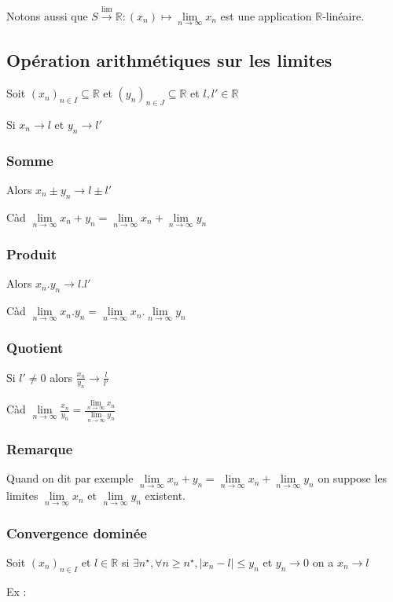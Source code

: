 \documentclass[a4paper,10pt]{article}
\newcommand{\ap}{\rightarrow}
\newcommand{\apw}[1]{\stackrel{#1}{\rightarrow}}
\newcommand{\R}{\mathbb{R}}
\newcommand{\abs}[1]{\left\vert #1 \right\vert}
\begin{document}
Notons aussi que $S \apw{\lim} \R : (x_n) \mapsto \lim\limits_{n\ap\infty} x_n$ est une application $\R$-linéaire.

\subsection{Opération arithmétiques sur les limites}
Soit $(x_n)_{n\in I} \subseteq \R$ et $(y_n)_{n \in J} \subseteq \R$ et $l,l' \in \R$

Si $x_n \ap l$ et $y_n \ap l'$ 
\subsubsection{Somme}
Alors $x_n \pm y_n \ap l \pm l'$

Càd $\lim\limits_{n\ap\infty} x_n + y_n = \lim\limits_{n\ap\infty} x_n + \lim\limits_{n\ap\infty} y_n$
\subsubsection{Produit}
Alors $x_n . y_n \ap l . l'$

Càd $\lim\limits_{n\ap\infty} x_n . y_n = \lim\limits_{n\ap\infty} x_n . \lim\limits_{n\ap\infty} y_n$
\subsubsection{Quotient}
Si $l' \neq 0$ alors $\frac{x_n}{y_n} \ap \frac{l}{l'}$

Càd $\lim\limits_{n\ap\infty} \frac{x_n}{y_n} = \frac{\lim\limits_{n\ap\infty} x_n}{\lim\limits_{n\ap\infty} y_n}$

\subsubsection{Remarque}

Quand on dit par exemple $\lim\limits_{n\ap\infty} x_n + y_n = \lim\limits_{n\ap\infty} x_n + \lim\limits_{n\ap\infty} y_n$ on suppose les limites $\lim\limits_{n\ap\infty} x_n$ et $\lim\limits_{n\ap\infty} y_n$ existent.

\subsubsection{Convergence dominée}

Soit $(x_n)_{n \in I}$ et $l \in \R$ si $\exists n^\star, \forall n \geq n^\star, \abs{x_n - l} \leq y_n$ et $y_n \ap 0$ on a $x_n \ap l$

Ex : 
\end{document}
